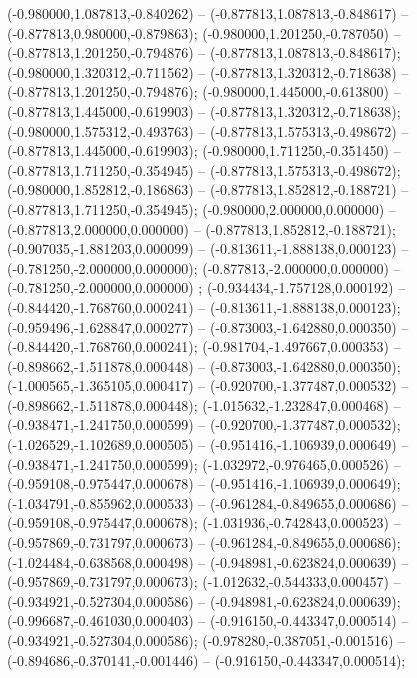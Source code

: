  (-0.980000,1.087813,-0.840262) -- (-0.877813,1.087813,-0.848617) -- (-0.877813,0.980000,-0.879863);
 (-0.980000,1.201250,-0.787050) -- (-0.877813,1.201250,-0.794876) -- (-0.877813,1.087813,-0.848617);
 (-0.980000,1.320312,-0.711562) -- (-0.877813,1.320312,-0.718638) -- (-0.877813,1.201250,-0.794876);
 (-0.980000,1.445000,-0.613800) -- (-0.877813,1.445000,-0.619903) -- (-0.877813,1.320312,-0.718638);
 (-0.980000,1.575312,-0.493763) -- (-0.877813,1.575313,-0.498672) -- (-0.877813,1.445000,-0.619903);
 (-0.980000,1.711250,-0.351450) -- (-0.877813,1.711250,-0.354945) -- (-0.877813,1.575313,-0.498672);
 (-0.980000,1.852812,-0.186863) -- (-0.877813,1.852812,-0.188721) -- (-0.877813,1.711250,-0.354945);
 (-0.980000,2.000000,0.000000) -- (-0.877813,2.000000,0.000000) -- (-0.877813,1.852812,-0.188721);
 (-0.907035,-1.881203,0.000099) -- (-0.813611,-1.888138,0.000123) -- (-0.781250,-2.000000,0.000000);
 (-0.877813,-2.000000,0.000000) -- (-0.781250,-2.000000,0.000000) ;
 (-0.934434,-1.757128,0.000192) -- (-0.844420,-1.768760,0.000241) -- (-0.813611,-1.888138,0.000123);
 (-0.959496,-1.628847,0.000277) -- (-0.873003,-1.642880,0.000350) -- (-0.844420,-1.768760,0.000241);
 (-0.981704,-1.497667,0.000353) -- (-0.898662,-1.511878,0.000448) -- (-0.873003,-1.642880,0.000350);
 (-1.000565,-1.365105,0.000417) -- (-0.920700,-1.377487,0.000532) -- (-0.898662,-1.511878,0.000448);
 (-1.015632,-1.232847,0.000468) -- (-0.938471,-1.241750,0.000599) -- (-0.920700,-1.377487,0.000532);
 (-1.026529,-1.102689,0.000505) -- (-0.951416,-1.106939,0.000649) -- (-0.938471,-1.241750,0.000599);
 (-1.032972,-0.976465,0.000526) -- (-0.959108,-0.975447,0.000678) -- (-0.951416,-1.106939,0.000649);
 (-1.034791,-0.855962,0.000533) -- (-0.961284,-0.849655,0.000686) -- (-0.959108,-0.975447,0.000678);
 (-1.031936,-0.742843,0.000523) -- (-0.957869,-0.731797,0.000673) -- (-0.961284,-0.849655,0.000686);
 (-1.024484,-0.638568,0.000498) -- (-0.948981,-0.623824,0.000639) -- (-0.957869,-0.731797,0.000673);
 (-1.012632,-0.544333,0.000457) -- (-0.934921,-0.527304,0.000586) -- (-0.948981,-0.623824,0.000639);
 (-0.996687,-0.461030,0.000403) -- (-0.916150,-0.443347,0.000514) -- (-0.934921,-0.527304,0.000586);
 (-0.978280,-0.387051,-0.001516) -- (-0.894686,-0.370141,-0.001446) -- (-0.916150,-0.443347,0.000514);

